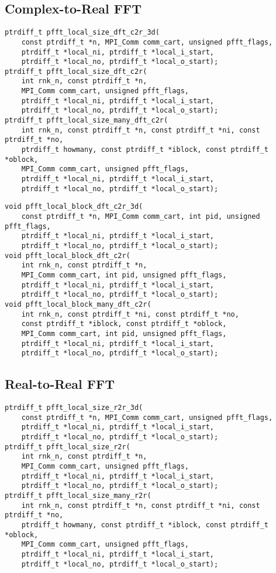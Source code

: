\subsection{Complex-to-Real FFT}
\begin{lstlisting}
ptrdiff_t pfft_local_size_dft_c2r_3d(
    const ptrdiff_t *n, MPI_Comm comm_cart, unsigned pfft_flags,
    ptrdiff_t *local_ni, ptrdiff_t *local_i_start,
    ptrdiff_t *local_no, ptrdiff_t *local_o_start);
ptrdiff_t pfft_local_size_dft_c2r(
    int rnk_n, const ptrdiff_t *n,
    MPI_Comm comm_cart, unsigned pfft_flags,
    ptrdiff_t *local_ni, ptrdiff_t *local_i_start,
    ptrdiff_t *local_no, ptrdiff_t *local_o_start);
ptrdiff_t pfft_local_size_many_dft_c2r(
    int rnk_n, const ptrdiff_t *n, const ptrdiff_t *ni, const ptrdiff_t *no,
    ptrdiff_t howmany, const ptrdiff_t *iblock, const ptrdiff_t *oblock,
    MPI_Comm comm_cart, unsigned pfft_flags,
    ptrdiff_t *local_ni, ptrdiff_t *local_i_start,
    ptrdiff_t *local_no, ptrdiff_t *local_o_start);
\end{lstlisting}

\begin{lstlisting}
void pfft_local_block_dft_c2r_3d(
    const ptrdiff_t *n, MPI_Comm comm_cart, int pid, unsigned pfft_flags,
    ptrdiff_t *local_ni, ptrdiff_t *local_i_start,
    ptrdiff_t *local_no, ptrdiff_t *local_o_start);
void pfft_local_block_dft_c2r(
    int rnk_n, const ptrdiff_t *n,
    MPI_Comm comm_cart, int pid, unsigned pfft_flags,
    ptrdiff_t *local_ni, ptrdiff_t *local_i_start,
    ptrdiff_t *local_no, ptrdiff_t *local_o_start);
void pfft_local_block_many_dft_c2r(
    int rnk_n, const ptrdiff_t *ni, const ptrdiff_t *no,
    const ptrdiff_t *iblock, const ptrdiff_t *oblock,
    MPI_Comm comm_cart, int pid, unsigned pfft_flags,
    ptrdiff_t *local_ni, ptrdiff_t *local_i_start,
    ptrdiff_t *local_no, ptrdiff_t *local_o_start);
\end{lstlisting}

\subsection{Real-to-Real FFT}
\begin{lstlisting}
ptrdiff_t pfft_local_size_r2r_3d(
    const ptrdiff_t *n, MPI_Comm comm_cart, unsigned pfft_flags,
    ptrdiff_t *local_ni, ptrdiff_t *local_i_start,
    ptrdiff_t *local_no, ptrdiff_t *local_o_start);
ptrdiff_t pfft_local_size_r2r(
    int rnk_n, const ptrdiff_t *n,
    MPI_Comm comm_cart, unsigned pfft_flags,
    ptrdiff_t *local_ni, ptrdiff_t *local_i_start,
    ptrdiff_t *local_no, ptrdiff_t *local_o_start);
ptrdiff_t pfft_local_size_many_r2r(
    int rnk_n, const ptrdiff_t *n, const ptrdiff_t *ni, const ptrdiff_t *no,
    ptrdiff_t howmany, const ptrdiff_t *iblock, const ptrdiff_t *oblock,
    MPI_Comm comm_cart, unsigned pfft_flags,
    ptrdiff_t *local_ni, ptrdiff_t *local_i_start,
    ptrdiff_t *local_no, ptrdiff_t *local_o_start);
\end{lstlisting}


